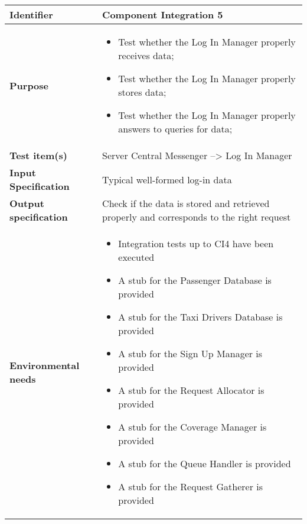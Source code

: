 \begin{center}
\begin{tabular}{lp{}}
\toprule
\textbf{Identifier}		&	Component Integration 5\\
\midrule
\textbf{Purpose}		&	\begin{itemize}
					\item Test whether the Log In Manager properly receives data;
					\item Test whether the Log In Manager properly stores data;
					\item Test whether the Log In Manager properly answers to queries for data;
					\end{itemize}	\\
\textbf{Test item(s)}	&	Server Central Messenger --> Log In Manager\\
\textbf{Input Specification}	&	Typical well-formed log-in data\\
\textbf{Output specification}	&	Check if the data is stored and retrieved properly and corresponds to the right request\\
\textbf{Environmental needs}	&	\begin{itemize}
							\item Integration tests up to CI4 have been executed
							\item A stub for the Passenger Database is provided
							\item A stub for the Taxi Drivers Database is provided
							\item A stub for the Sign Up Manager is provided												\item A stub for the Request Allocator is provided
							\item A stub for the Coverage Manager is provided
							\item A stub for the Queue Handler is provided
							\item A stub for the Request Gatherer is provided
							\end{itemize}	\\
\bottomrule
\end{tabular}
\end{center}



